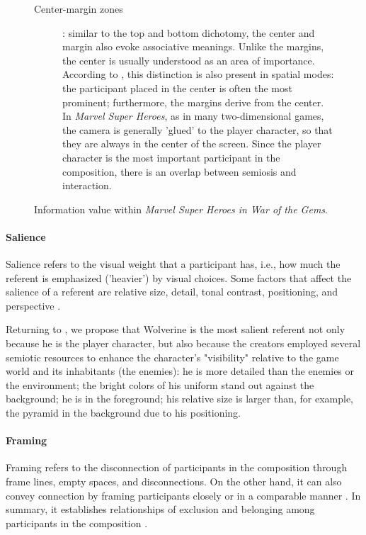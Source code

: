 \documentclass[english]{textolivre}
\begin{document}
\begin{figure}[htbp]
\begin{minipage}[t]{\textwidth}
\begin{description}
    \item[Center-margin zones]: similar to the top and bottom dichotomy, the center and margin also evoke associative meanings. Unlike the margins, the center is usually understood as an area of importance. According to \textcite[p. 198]{kress_reading_2020}, this distinction is also present in spatial modes: the participant placed in the center is often the most prominent; furthermore, the margins derive from the center. In \textit{Marvel Super Heroes}, as in many two-dimensional games, the camera is generally 'glued' to the player character, so that they are always in the center of the screen. Since the player character is the most important participant in the composition, there is an overlap between semiosis and interaction.
\end{description}
\end{minipage}
\caption{Information value within \textit{Marvel Super Heroes in War of the Gems}.}
\label{chart4}
\end{figure}

\paragraph{Salience}\label{sec-format-simple}
Salience refers to the visual weight that a participant has, i.e., how much the referent is emphasized ('heavier') by visual choices. Some factors that affect the salience of a referent are relative size, detail, tonal contrast, positioning, and perspective \cites[p. 198]{van_leeuwen_introducing_2005}[p. 182]{kress_reading_2020}.

Returning to , we propose that Wolverine is the most salient referent not only because he is the player character, but also because the creators employed several semiotic resources to enhance the character's "visibility" relative to the game world and its inhabitants (the enemies): he is more detailed than the enemies or the environment; the bright colors of his uniform stand out against the background; he is in the foreground; his relative size is larger than, for example, the pyramid in the background due to his positioning.

\paragraph{Framing}\label{sec-format-simple}
Framing refers to the disconnection of participants in the composition through frame lines, empty spaces, and disconnections. On the other hand, it can also convey connection by framing participants closely or in a comparable manner \cite[p.~277]{van_leeuwen_introducing_2005}. In summary, it establishes relationships of exclusion and belonging among participants in the composition \cite[p. 181-2]{kress_reading_2020}.
\end{document}
